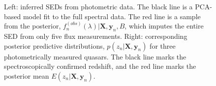 \documentclass{article}
\begin{document}
\begin{figure}[t]
\vskip -0.2in
\caption{Left: inferred SEDs from photometric data.  The black line is a PCA-based model fit to the full spectral data.  The red line is a sample from the posterior, $f^{(obs)}_n(\lambda) | \mathbf{X}, \mathbf{y}_n, B$, which imputes the entire SED from only five flux measurements. Right: corresponding posterior predictive distributions, $p(z_n | \mathbf{X}, \mathbf{y}_n)$ for three photometrically measured quasars. The black line marks the spectroscopically confirmed redshift, and the red line marks the posterior mean $E(z_n |\mathbf{X}, \mathbf{y}_n)$. }
\label{fig:recon}
\vskip -0.1in
\end{figure}

\end{document}
